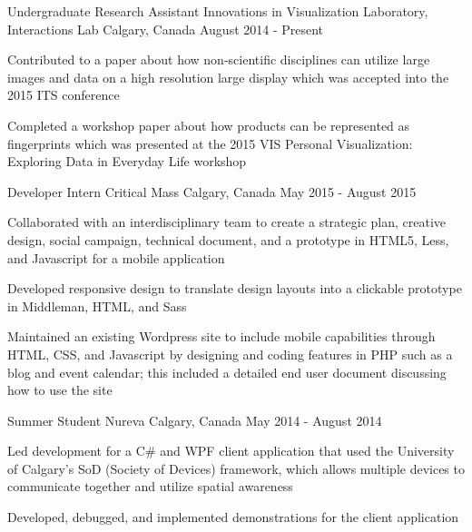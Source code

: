 \begin{cventries}
  \cventry
    {Undergraduate Research Assistant}
    {Innovations in Visualization Laboratory, Interactions Lab}
    {Calgary, Canada}
    {August 2014 - Present}
    {
      \begin{cvitems}
        \item {Contributed to a paper about how non-scientific disciplines can utilize large images and data on a high resolution large display which was accepted into the 2015 ITS conference}
        \item {Completed a workshop paper about how products can be represented as fingerprints which was presented at the 2015 VIS Personal Visualization: Exploring Data in Everyday Life workshop}
      \end{cvitems}
    }
  \cventry
    {Developer Intern}
    {Critical Mass}
    {Calgary, Canada}
    {May 2015 - August 2015}
    {
      \begin{cvitems}
        \item {Collaborated with an interdisciplinary team to create a strategic plan, creative design, social campaign, technical document, and a prototype in HTML5, Less, and Javascript for a mobile application}
        \item {Developed responsive design to translate design layouts into a clickable prototype in Middleman, HTML, and Sass}
        \item {Maintained an existing Wordpress site to include mobile capabilities through HTML, CSS, and Javascript by designing and coding features in PHP such as a blog and event calendar; this included a detailed end user document discussing how to use the site}
      \end{cvitems}
    }
  \cventry
    {Summer Student}
    {Nureva}
    {Calgary, Canada}
    {May 2014 - August 2014}
    {
      \begin{cvitems}
        \item {Led development for a C\# and WPF client application that used the University of Calgary's SoD (Society of Devices) framework, which allows multiple devices to communicate together and utilize spatial awareness}
        \item {Developed, debugged, and implemented demonstrations for the client application}
      \end{cvitems}  
}
\end{cventries}
